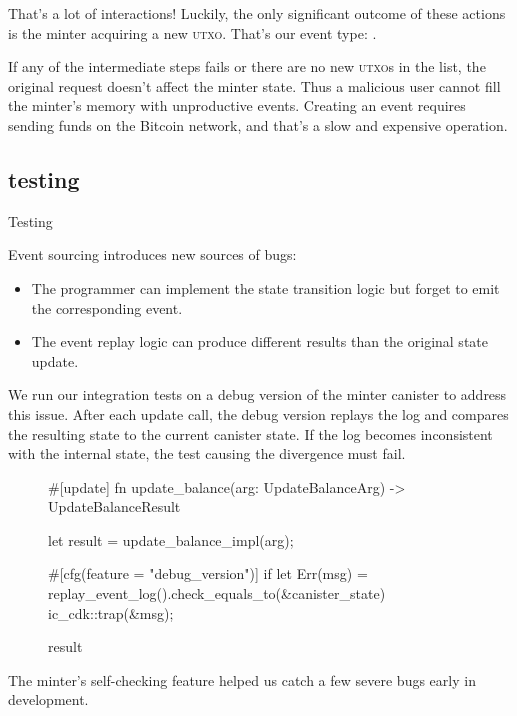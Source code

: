 \documentclass{article}
\begin{document}
That's a lot of interactions!
Luckily, the only significant outcome of these actions is the minter acquiring a new \textsc{utxo}.
That's our event type: .

If any of the intermediate steps fails or there are no new \textsc{utxo}s in the list, the original request doesn't affect the minter state.
Thus a malicious user cannot fill the minter's memory with unproductive events.
Creating an event requires sending funds on the Bitcoin network, and that's a slow and expensive operation.

\subsection{testing}{Testing}

Event sourcing introduces new sources of bugs:

\begin{itemize}
   \item
   The programmer can implement the state transition logic but forget to emit the corresponding event.
   \item
   The event replay logic can produce different results than the original state update.
\end{itemize}

We run our integration tests on a debug version of the minter canister to address this issue.
After each update call, the debug version replays the log and compares the resulting state to the current canister state.
If the log becomes inconsistent with the internal state, the test causing the divergence must fail.

\begin{figure}
\begin{code}[rust]
#[update]
fn update_balance(arg: UpdateBalanceArg) -> UpdateBalanceResult {
    let result = update_balance_impl(arg);

    #[cfg(feature = "debug_version")]
    if let Err(msg) = replay_event_log().check_equals_to(&canister_state) {
      ic_cdk::trap(&msg);
    }

    result
}
\end{code}
\end{figure}

The minter's self-checking feature helped us catch a few severe bugs early in development.
\end{document}

